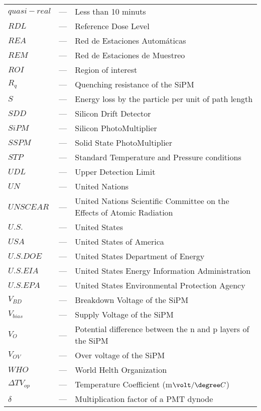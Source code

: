 \begin{longtable}{p{25mm} c p{120mm} }
$quasi-real$ & --- & Less than 10 minuts\\
$RDL$ & --- & Reference Dose Level\\
$REA$ & --- & Red de Estaciones Automáticas\\
$REM$ & --- & Red de Estaciones de Muestreo\\
$ROI$ & --- & Region of interest\\
$R_q$ & --- & Quenching resistance of the SiPM\\
$S$ & --- & Energy loss by the particle per unit of path length\\
$SDD$ & --- & Silicon Drift Detector\\
$SiPM$ & --- & Silicon PhotoMultiplier\\
$SSPM$ & --- & Solid State PhotoMultiplier\\
$STP$ & --- & Standard Temperature and Pressure conditions\\
$UDL$ & --- & Upper Detection Limit\\
$UN$ & --- & United Nations\\
$UNSCEAR$ & --- & United Nations Scientific Committee on the Effects
\newline
of Atomic Radiation\\
$U.S.$ & --- & United States\\
$USA$ & --- & United States of America\\
$U.S. DOE$ & --- & United States Department of Energy\\
$U.S. EIA$ & --- & United States Energy Information Administration\\
$U.S. EPA$ & --- & United States Environmental Protection Agency\\
$V_{BD}$ & --- & Breakdown Voltage of the SiPM\\
$V_{bias}$ & --- & Supply Voltage of the SiPM\\
$V_{O}$ & --- & Potential difference between the n and p layers of 
\newline
the SiPM\\
$V_{OV}$ & --- & Over voltage of the SiPM\\
$WHO$ & --- & World Helth Organization\\
$\Delta TV_{op}$ & --- & Temperature Coefficient (m$\volt/\degree C$)\\
$\delta$ & --- & Multiplication factor of a PMT dynode\\


\end{longtable}

